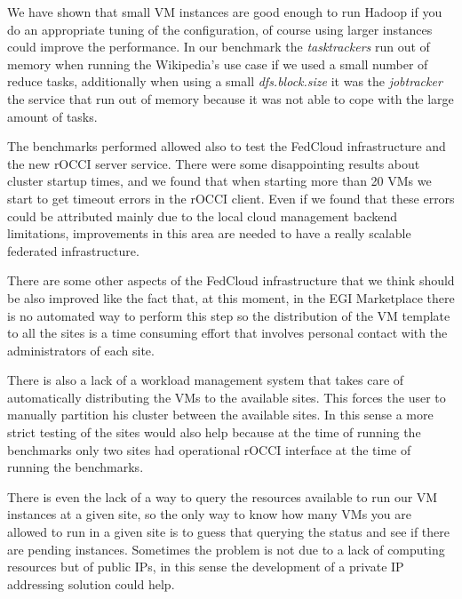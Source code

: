 \documentclass[oribibl]{llncs_Ibergrid2013}
\begin{document}
We have shown that small VM instances are good enough to run Hadoop if you do an appropriate tuning of the configuration, of course using larger instances could improve the performance. In our benchmark the \emph{tasktrackers} run out of memory when running the Wikipedia's use case if we used a small number of reduce tasks, additionally when using a small \emph{dfs.block.size} it was the \emph{jobtracker} the service that run out of memory because it was not able to cope with the large amount of tasks.

The benchmarks performed allowed also to test the FedCloud infrastructure and the new rOCCI server service. There were some disappointing results about cluster startup times, and we found that when starting more than 20 VMs we start to get timeout errors in the rOCCI client. Even if we found that these errors could be attributed mainly due to the local cloud management backend limitations, improvements in this area are needed to have a really scalable federated infrastructure.

There are some other aspects of the FedCloud infrastructure that we think should be also improved like the fact that, at this moment, in the EGI Marketplace there is no automated way to perform this step so the distribution of the VM template to all the sites is a time consuming effort that involves personal contact with the administrators of each site.

There is also a lack of a workload management system that takes care of automatically distributing the VMs to the available sites. This forces the user to manually partition his cluster between the available sites. In this sense a more strict testing of the sites would also help because at the time of running the benchmarks only two sites had operational rOCCI interface at the time of running the benchmarks.

There is even the lack of a way to query the resources available to run our VM instances at a given site, so the only way to know how many VMs you are allowed to run in a given site is to guess that querying the status and see if there are pending instances. Sometimes the problem is not due to a lack of computing resources but of public IPs, in this sense the development of a private IP addressing solution could help.
\end{document}
